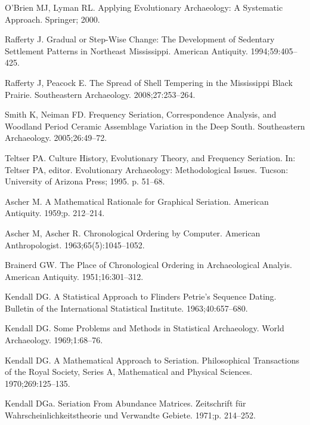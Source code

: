 \documentclass[10pt,letterpaper]{article}
\begin{document}
\begin{thebibliography}{10}
O'Brien MJ, Lyman RL.
\newblock Applying Evolutionary Archaeology: A Systematic Approach.
\newblock Springer; 2000.

Rafferty J.
\newblock Gradual or Step-Wise Change: The Development of Sedentary Settlement
  Patterns in Northeast Mississippi.
\newblock American Antiquity. 1994;59:405--425.

Rafferty J, Peacock E.
\newblock The Spread of Shell Tempering in the Mississippi Black Prairie.
\newblock Southeastern Archaeology. 2008;27:253--264.

Smith K, Neiman FD.
\newblock Frequency Seriation, Correspondence Analysis, and Woodland Period
  Ceramic Assemblage Variation in the Deep South.
\newblock Southeastern Archaeology. 2005;26:49--72.

Teltser PA.
\newblock Culture History, Evolutionary Theory, and Frequency Seriation.
\newblock In: Teltser PA, editor. Evolutionary Archaeology: Methodological
  Issues. Tucson: University of Arizona Press; 1995. p. 51--68.

Ascher M.
\newblock A Mathematical Rationale for Graphical Seriation.
\newblock American Antiquity. 1959;p. 212--214.

Ascher M, Ascher R.
\newblock Chronological Ordering by Computer.
\newblock American Anthropologist. 1963;65(5):1045--1052.

Brainerd GW.
\newblock The Place of Chronological Ordering in Archaeological Analyis.
\newblock American Antiquity. 1951;16:301--312.

Kendall DG.
\newblock A Statistical Approach to Flinders Petrie's Sequence Dating.
\newblock Bulletin of the International Statistical Institute.
  1963;40:657--680.

Kendall DG.
\newblock Some Problems and Methods in Statistical Archaeology.
\newblock World Archaeology. 1969;1:68--76.

Kendall DG.
\newblock A Mathematical Approach to Seriation.
\newblock Philosophical Transactions of the Royal Society, Series A,
  Mathematical and Physical Sciences. 1970;269:125--135.

Kendall DGa.
\newblock Seriation From Abundance Matrices.
\newblock Zeitschrift f{\"u}r Wahrscheinlichkeitstheorie und Verwandte Gebiete.
  1971;p. 214--252.


\end{thebibliography}
\end{document}
